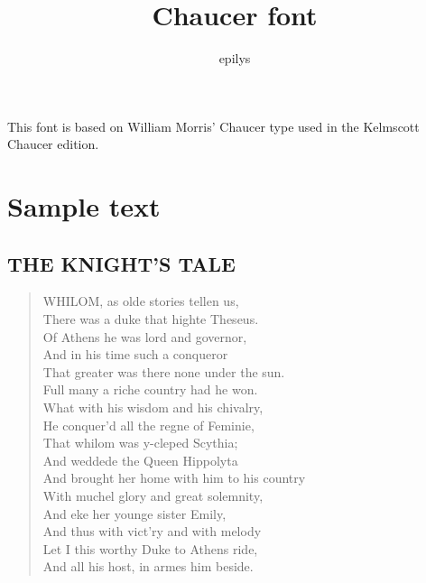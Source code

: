 \documentclass{article}
\title{Chaucer font}
\author{epilys}
\begin{document}
\maketitle
This font is based on William Morris' Chaucer type used in the Kelmscott Chaucer edition.

\section{Sample text}

\subsection{THE KNIGHT'S TALE}
\begin{verse}
WHILOM, as olde stories tellen us,\\
There was a duke that highte Theseus.\\
Of Athens he was lord and governor,\\
And in his time such a conqueror\\
That greater was there none under the sun.\\
Full many a riche country had he won.\\
What with his wisdom and his chivalry,\\
He conquer'd all the regne of Feminie,\\
That whilom was y-cleped Scythia;\\
And weddede the Queen Hippolyta\\
And brought her home with him to his country\\
With muchel glory and great solemnity,\\
And eke her younge sister Emily,\\
And thus with vict'ry and with melody\\
Let I this worthy Duke to Athens ride,\\
And all his host, in armes him beside.
\end{verse}
\end{document}
